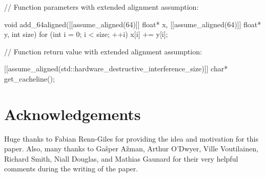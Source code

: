\begin{addedblock}
\begin{example}
\begin{codeblock}
// Function parameters with extended alignment assumption:

void add_64aligned([[assume_aligned(64)]] float* x,
                   [[assume_aligned(64)]] float* y, int size)
{    
    for (int i = 0; i < size; ++i)
        x[i] += y[i];
}

// Function return value with extended alignment assumption:

[[assume_aligned(std::hardware_destructive_interference_size)]] char* get_cacheline();
\end{codeblock}
\end{example}
\end{addedblock}

\section*{Acknowledgements}

Huge thanks to Fabian Renn-Giles for providing the idea and motivation for this paper. Also, many thanks to Ga\v sper A\v zman, Arthur O'Dwyer, Ville Voutilainen, Richard Smith, Niall Douglas, and Mathias Gaunard for their very helpful comments during the writing of the paper.

\pagebreak

\renewcommand{\bibname}{References}



